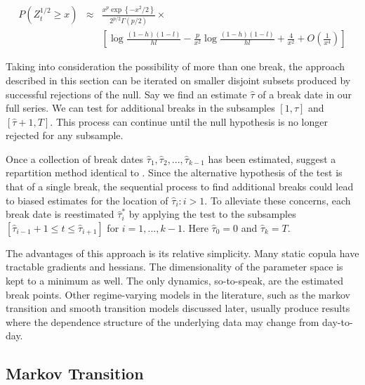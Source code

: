 \documentclass[12pt]{article}
\begin{document}
\begin{eqnarray}
P\left(Z_{t}^{1/2} \geq x\right) &\approx& \frac{x^{p} \exp\left\{-x^{2}/2\right\}}{2^{p/2}\Gamma \left(p/2\right)} \times  \\
                                 && \left[\log \frac{\left(1-h\right) \left(1-l\right)}{hl} - \frac{p}{x^{2}}\log \frac{\left(1-h\right)\left(1-l\right)}{hl} + \frac{4}{x^{2}} + O \left(\frac{1}{x^{4}}\right)\right]
\end{eqnarray}

Taking into consideration the possibility of more than one break, the approach described in this section can be iterated on smaller disjoint subsets produced by successful rejections of the null. Say we find an estimate $\hat{\tau}$ of a break date in our full series. We can test for additional breaks in the subsamples $\left[1, \hat{\tau}\right]$ and $\left[\hat{\tau} + 1, T\right]$. This process can continue until the null hypothesis is no longer rejected for any subsample.

Once a collection of break dates $\hat{\tau}_{1},\hat{\tau}_{2},...,\hat{\tau}_{k-1}$ has been estimated, \cite{Dias_and_Embrechts_2009} suggest a repartition method identical to \cite{Bai_1997}. Since the alternative hypothesis of the test is that of a single break, the sequential process to find additional breaks could lead to biased estimates for the location of $\hat{\tau}_{i}:i > 1$. To alleviate these concerns, each break date is reestimated $\hat{\tau}_{i}^{\ast}$ by applying the test to the subsamples $\left[ \hat{\tau}_{i-1}+1\leq t\leq \hat{\tau}_{i+1}\right]$ for $i=1,...,k-1$. Here $\hat{\tau}_{0} = 0$ and $\hat{\tau}_{k} = T$.

The advantages of this approach is its relative simplicity. Many static copula have tractable gradients and hessians. The dimensionality of the parameter space is kept to a minimum as well. The only dynamics, so-to-speak, are the estimated break points. Other regime-varying models in the literature, such as the markov transition and smooth transition models discussed later, usually produce results where the dependence structure of the underlying data may change from day-to-day.

\subsection{Markov Transition}
\end{document}
